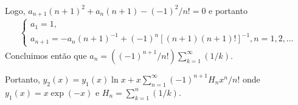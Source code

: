 \documentclass[a4paper,12pt, leqno, answers]{exam}
\begin{document}
\begin{questions}
\begin{solution}
\begin{align*}
        \end{align*}
        Logo, $a_{n + 1} (n + 1)^2 + a_n (n + 1) - (-1)^2 / n! = 0$ e portanto
        \begin{align*}
            \begin{cases}
                a_1 = 1, \\
                a_{n + 1} = -a_n (n + 1)^{-1} + (-1)^n \left[ (n + 1) (n + 1)! \right]^{-1}, n = 1, 2, \ldots
            \end{cases}
        \end{align*}
        Concluimos ent\~{a}o que $a_n = \left( (-1)^{n + 1} / n! \right) \sum_{k = 1}^\infty (1/k)$.

        Portanto, $y_2(x) = y_1(x) \ln x + x \sum_{n = 1}^\infty (-1)^{n + 1} H_n x^n / n!$ onde $y_1(x) = x \exp(-x)$ e $H_n = \sum_{k = 1}^n (1/k)$.
    \end{solution}


\end{questions}
\end{document}
